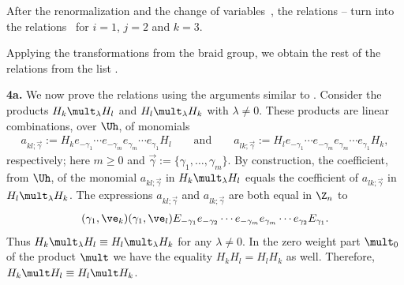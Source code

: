 After the renormalization  and the change of variables~, the relations -- turn into
the relations~ for $i=1$, $j=2$ and $k=3$.


Applying the transformations from the braid group, we obtain the rest of the relations from the list .

{\bf 4a.} We now prove the relations  using the arguments similar to \cite[Subsection 6.1.2]{Zh}.
 Consider the
products $H_k\mult_\lambda H_l$  and $H_l\mult_\lambda H_k$ with $\lambda\not=0$.
These products are linear combinations, over $\Uh$, of monomials
\begin{gather*}
a_{kl;\vec{\gamma}}:=H_ke_{-\gamma_1}\cdots e_{-\gamma_m}e_{\gamma_m}\cdots e_{\gamma_1}H_l\qquad\text{and}\qquad
a_{lk;\vec{\gamma}}:=H_le_{-\gamma_1}\cdots e_{-\gamma_m}e_{\gamma_m}\cdots e_{\gamma_1}H_k  ,
\end{gather*}
respectively; here $m\geq 0$ and $\vec{\gamma}:=\{\gamma_1,\dots ,\gamma_m\}$. By construction, the coef\/f\/icient, from $\Uh$, of the monomial
$a_{kl;\vec{\gamma}}$ in $H_k\mult_\lambda H_l$ equals the coef\/f\/icient of $a_{lk;\vec{\gamma}}$ in $H_l\mult_\lambda H_k$.
The expressions $a_{kl;\vec{\gamma}}$ and $a_{lk;\vec{\gamma}}$ are both equal in $\Z_n$  to
\begin{gather*}(\gamma_1,\ve_k)(\gamma_1,\ve_l)E_{-\gamma_1}e_{-\gamma_2}\cdots
e_{-\gamma_m}e_{\gamma_m}\cdots e_{\gamma_2}E_{\gamma_1}  .\end{gather*}
Thus $H_k\mult_\lambda H_l\equiv H_l\mult_\lambda H_k$  for any $\lambda\not=0$. In the zero weight part $\mult_0$
of the product $\mult$ we have the equality $H_kH_l=H_lH_k$ as well. Therefore,
$H_k\mult H_l\equiv H_l\mult H_k$.

